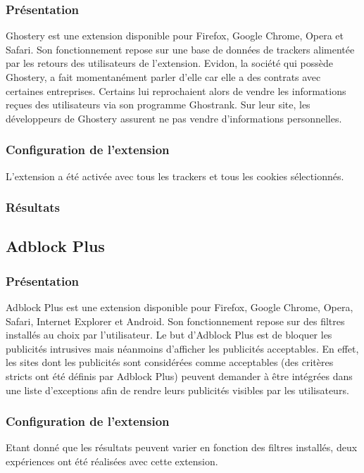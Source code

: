 \subsubsection{Présentation}
Ghostery \cite{ghostery_homepage} est une extension disponible pour Firefox, Google Chrome, Opera et Safari. Son fonctionnement repose sur une base de données de trackers alimentée par les retours des utilisateurs de l'extension. Evidon, la société qui possède Ghostery, a fait momentanément parler d'elle car elle a des contrats avec certaines entreprises. Certains lui reprochaient alors de vendre les informations reçues des utilisateurs via son programme Ghostrank. Sur leur site, les développeurs de Ghostery assurent ne pas vendre d'informations personnelles.

\subsubsection{Configuration de l'extension}
L'extension a été activée avec tous les trackers et tous les cookies sélectionnés.

\subsubsection{Résultats}


\subsection{Adblock Plus}
\subsubsection{Présentation}
Adblock Plus \cite{adblockplus_homepage} est une extension disponible pour Firefox, Google Chrome, Opera, Safari, Internet Explorer et Android. Son fonctionnement repose sur des filtres installés au choix par l'utilisateur. Le but d'Adblock Plus est de bloquer les publicités intrusives mais néanmoins d'afficher les publicités acceptables. En effet, les sites dont les publicités sont considérées comme acceptables (des critères stricts ont été définis par Adblock Plus) peuvent demander à être intégrées dans une liste d'exceptions afin de rendre leurs publicités visibles par les utilisateurs.

\subsubsection{Configuration de l'extension}
Etant donné que les résultats peuvent varier en fonction des filtres installés, deux expériences ont été réalisées avec cette extension.

